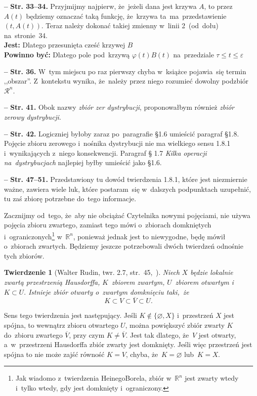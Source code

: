 \documentclass[a4paper,11pt]{article}
\newtheorem{twr}{Twierdzenie}
\let\emptyset\varnothing
\newcommand{\ol}{\overline}
\newcommand{\mb}{\mathbb}
\newcommand{\mc}{\mathcal}
\newcommand{\wtw}{wtedy i~tylko wtedy}
\newcommand{\veps}{\varepsilon}
\newcommand{\vp}{\varphi}
\newcommand{\R}{\mb{R}}
\newcommand{\Rn}{\R^{ n }}
\newcommand{\Rc}{\mc{R}}
\newcommand{\es}{\emptyset}
\newcommand{\subs}{\subset}
\newcommand{\tb}{\textbf}
\newcommand{\noi}{\noindent}
\newcommand{\start}{\noi \tb{--} {}}
\newcommand{\Str}[1]{\tb{Str. #1.}}
\newcommand{\Jest}{\tb{Jest: }}
\newcommand{\Pow}{\tb{Powinno być: }}
\newcommand{\Rnc}{\Rc^{ n }}
\begin{document}
\start \Str{33--34} Przyjmijmy najpierw, że~jeżeli dana jest krzywa
$A$, to przez $A( t )$ będziemy oznaczać taką funkcję, że~krzywa
ta~ma~przedstawienie $( t, A( t ) )$. Teraz należy dokonać takiej
zmienny w~linii 2~(od~dołu) na~stronie~34. \\
\Jest Dlatego przesunięta cześć krzywej $B$ \\
\Pow Dlatego pole pod~krzywą $\vp( t ) B( t )$ na~przedziale
$\tau \leq t \leq \veps$


\start \Str{36} W~tym miejscu po raz pierwszy chyba w~książce
pojawia~się termin ,,obszar''. Z~kontekstu wynika, że~należy przez
niego rozumieć dowolny podzbiór $\Rnc$.


\start \Str{41} Obok nazwy \emph{zbiór zer dystrybucji}, proponowałbym
również \emph{zbiór zerowy dystrybucji}.


\start \Str{42} Logiczniej byłoby zaraz po~paragrafie \S 1.6 umieścić
paragraf \S 1.8. Pojęcie zbioru zerowego i~nośnika dystrybucji nie ma
wielkiego sensu 1.8.1 i~wynikających z~niego konsekwencji. Paragraf \S
1.7 \emph{Kilka operacji na~dystrybucjach} najlepiej byłby umieścić
jako \S 1.6.


\start \Str{47--51} Przedstawiony tu dowód twierdzenia 1.8.1, które
jest niezmiernie ważne, zawiera wiele luk, które postaram~się
w~dalszych podpunktach uzupełnić, tu zaś zbiorę potrzebne do~tego
informacje.

Zacznijmy od~tego, że~aby nie obciążać Czytelnika nowymi pojęciami,
nie używa pojęcia zbioru zwartego, zamiast tego mówi o~zbiorach
domkniętych i~ograniczonych\footnote{Jak wiadomo z~twierdzenia
  Heinego\dywiz Borela, zbiór w~$\Rn$ jest zwarty \wtw, gdy jest
  domknięty i~ograniczony.} w~$\Rn$, ponieważ jednak jest to
niewygodne, będę mówił o~zbiorach zwartych. Będziemy jeszcze
potrzebowali dwóch twierdzeń odnośnie tych zbiorów.

\begin{twr}[Walter Rudin, twr. 2.7, str.~45,~\cite{Rud98}]
  \label{twr:Zem-s01-01}
  Niech $X$ będzie lokalnie zwartą przestrzenią Hausdorffa,
  $K$~zbiorem zwartym, $U$~zbiorem otwartym i~$K \subs U$. Istnieje
  zbiór otwarty o~zwartym domknięciu taki,~że
  \begin{equation}
    \label{eq:Zem-s01-04}
    K \subs V \subs \ol{ V } \subs U.
  \end{equation}
\end{twr}
Sens tego twierdzenia jest następujący. Jeśli $K \notin \{ \es, X \}$
i~przestrzeń $X$ jest spójna, to wewnątrz zbioru otwartego $U$, można
powiększyć zbiór zwarty $K$ do~zbioru zwartego $\ol{ V }$, przy czym
$K \neq \ol{ V }$. Jest tak dlatego, że~$V$ jest otwarty,
a~w~przestrzeni Hausdorffa zbiór zwarty jest domknięty. Jeśli więc
przestrzeń jest spójna to nie może zajść równość $K = V$, chyba,
że~$K = \es$ lub~$K = X$.
\end{document}
